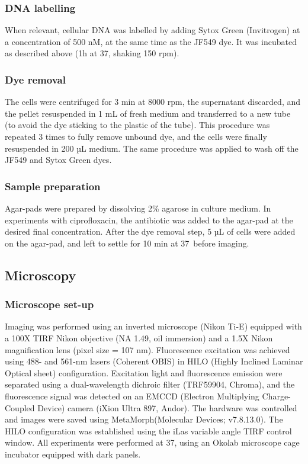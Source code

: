 \subsubsection*{DNA labelling}
When relevant, cellular DNA was labelled by adding Sytox Green (Invitrogen) at a concentration of 500 nM, at the same time as the JF549 dye. It was incubated as described above (1h at 37\celsius, shaking 150 rpm).
\subsubsection*{Dye removal}
The cells were centrifuged for 3 min at 8000 rpm, the supernatant discarded, and the pellet resuspended in 1 mL of fresh medium and transferred to a new tube (to avoid the dye sticking to the plastic of the tube). This procedure was repeated 3 times to fully remove unbound dye, and the cells were finally resuspended in 200 µL medium. The same procedure was applied to wash off the JF549 and Sytox Green dyes.
\subsubsection*{Sample preparation}
Agar-pads were prepared by dissolving 2\% agarose in culture medium. In experiments with ciprofloxacin, the antibiotic was added to the agar-pad at the desired final concentration. After the dye removal step, 5 µL of cells were added on the agar-pad, and left to settle for 10 min at 37\celsius\ before imaging.

\subsection*{Microscopy}
\subsubsection*{Microscope set-up}
Imaging was performed using an inverted microscope (Nikon Ti-E) equipped with a 100X TIRF Nikon objective (NA 1.49, oil immersion) and a 1.5X Nikon magnification lens (pixel size = 107 nm). Fluorescence excitation was achieved using 488- and 561-nm lasers (Coherent OBIS) in HILO (Highly Inclined Laminar Optical sheet) configuration. Excitation light and fluorescence emission were separated using a dual-wavelength dichroic filter (TRF59904, Chroma), and the fluorescence signal was detected on an EMCCD (Electron Multiplying Charge-Coupled Device) camera (iXion Ultra 897, Andor). The hardware was controlled and images were saved using MetaMorph(Molecular Devices; v7.8.13.0). The HILO configuration was established using the iLas variable angle TIRF control window. All experiments were performed at 37\celsius, using an Okolab microscope cage incubator equipped with dark panels.


